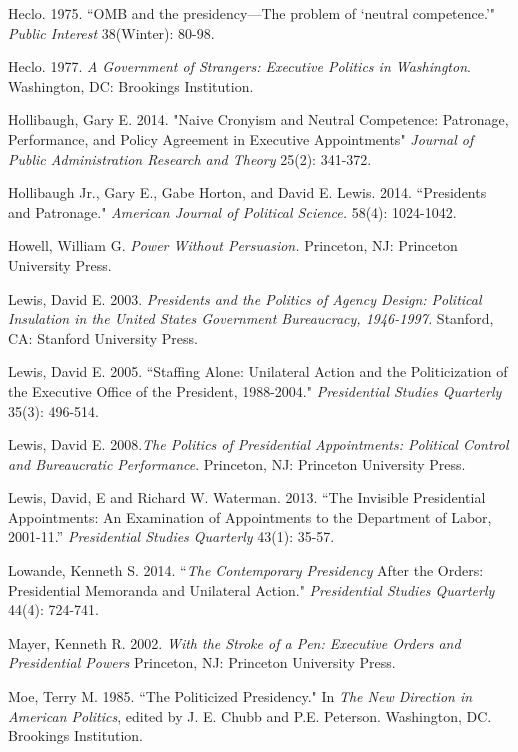 \documentclass[12pt]{article}
\begin{document}
\noindent \hangindent=0.7cm Heclo. 1975. ``OMB and the presidency---The problem of `neutral competence.'" \textit{Public Interest} 38(Winter): 80-98.

\noindent \hangindent=0.7cm Heclo. 1977. \textit{A Government of Strangers: Executive Politics in Washington}. Washington, DC: Brookings Institution.

\noindent \hangindent=0.7cm Hollibaugh, Gary E. 2014. "Naive Cronyism and Neutral Competence: Patronage, Performance, and Policy Agreement in Executive Appointments" \textit{Journal of Public Administration Research and Theory} 25(2): 341-372. 

\noindent \hangindent=0.7cm Hollibaugh Jr., Gary E., Gabe Horton, and David E. Lewis. 2014. ``Presidents and Patronage." \textit{American Journal of Political Science.} 58(4): 1024-1042.

\noindent \hangindent=0.7cm Howell, William G. \textit{Power Without Persuasion.} Princeton, NJ: Princeton University Press.

\noindent \hangindent=0.7cm Lewis, David E. 2003. \textit{Presidents and the Politics of Agency Design: Political Insulation in the United States Government Bureaucracy, 1946-1997.} Stanford, CA: Stanford University Press.

\noindent \hangindent=0.7cm Lewis, David E. 2005. ``Staffing Alone: Unilateral Action and the Politicization of the Executive Office of the President, 1988-2004." \textit{Presidential Studies Quarterly} 35(3): 496-514.

\noindent \hangindent=0.7cm Lewis, David E. 2008.\textit{The Politics of Presidential Appointments: Political Control and Bureaucratic Performance}. Princeton, NJ: Princeton University Press. 

\noindent \hangindent=0.7cm Lewis, David, E and Richard W. Waterman. 2013. ``The Invisible Presidential Appointments: An Examination of Appointments to the Department of Labor, 2001-11.'' \textit{Presidential Studies Quarterly} 43(1): 35-57.

\noindent \hangindent=0.7cm Lowande, Kenneth S. 2014. ``\textit{The Contemporary Presidency} After the Orders: Presidential Memoranda and Unilateral Action." \textit{Presidential Studies Quarterly} 44(4): 724-741.

\noindent \hangindent=0.7cm Mayer, Kenneth R. 2002. \textit{With the Stroke of a Pen: Executive Orders and Presidential Powers} Princeton, NJ: Princeton University Press. 

\noindent \hangindent=0.7cm  Moe, Terry M. 1985. ``The Politicized Presidency." In \textit{The New Direction in American Politics}, edited by J. E. Chubb and P.E. Peterson. Washington, DC. Brookings Institution. 
\end{document}
